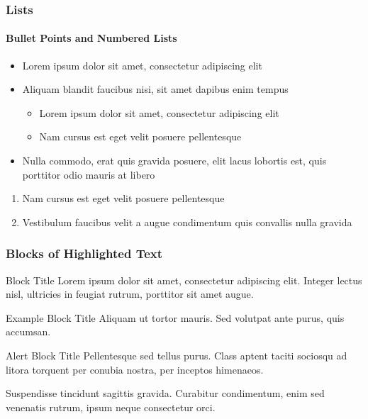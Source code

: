 \documentclass[
	11pt, %
]{beamer}
\begin{document}

\begin{frame}
    \frametitle{Lists}
    \framesubtitle{Bullet Points and Numbered Lists} %

    \begin{itemize}
        \item Lorem ipsum dolor sit amet, consectetur adipiscing elit
        \item Aliquam blandit faucibus nisi, sit amet dapibus enim tempus
              \begin{itemize}
                  \item Lorem ipsum dolor sit amet, consectetur adipiscing elit
                  \item Nam cursus est eget velit posuere pellentesque
              \end{itemize}
        \item Nulla commodo, erat quis gravida posuere, elit lacus lobortis est, quis porttitor odio mauris at libero
    \end{itemize}

    \bigskip %

    \begin{enumerate}
        \item Nam cursus est eget velit posuere pellentesque
        \item Vestibulum faucibus velit a augue condimentum quis convallis nulla gravida
    \end{enumerate}
\end{frame}



\begin{frame}
    \frametitle{Blocks of Highlighted Text}

    \begin{block}{Block Title}
        Lorem ipsum dolor sit amet, consectetur adipiscing elit. Integer lectus nisl, ultricies in feugiat rutrum, porttitor sit amet augue.
    \end{block}

    \begin{exampleblock}{Example Block Title}
        Aliquam ut tortor mauris. Sed volutpat ante purus, quis accumsan.
    \end{exampleblock}

    \begin{alertblock}{Alert Block Title}
        Pellentesque sed tellus purus. Class aptent taciti sociosqu ad litora torquent per conubia nostra, per inceptos himenaeos.
    \end{alertblock}

    \begin{block}{} %
        Suspendisse tincidunt sagittis gravida. Curabitur condimentum, enim sed venenatis rutrum, ipsum neque consectetur orci.
    \end{block}
\end{frame}
\end{document}
